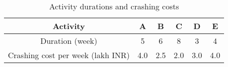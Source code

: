 \begin{table}[h!]
  \centering
  \begin{tabular}{|c|c|c|c|c|c|}
    \hline
    Activity & A & B & C & D & E \\ \hline
    Duration (week) & 5 & 6 & 8 & 3 & 4 \\
    Crashing cost per week (lakh INR) & 4.0 & 2.5 & 2.0 & 3.0 & 4.0 \\ \hline
  \end{tabular}
  \caption{Activity durations and crashing costs}
  \label{tab:activities}
\end{table}

